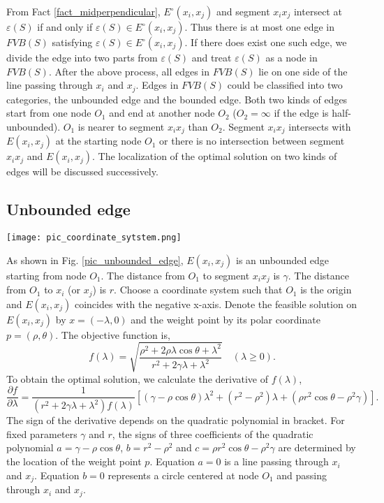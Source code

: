 \documentclass[final,3p,times]{elsarticle}
\begin{document}
From Fact \ref{fact_midperpendicular}, $E^\circ(x_i,x_j)$ and segment $x_ix_j$ intersect at $\varepsilon(S)$ if and only if $\varepsilon(S)\in E^\circ(x_i,x_j)$. Thus there is at most one edge in $FVB(S)$ satisfying $\varepsilon(S)\in E^\circ(x_i,x_j)$. If there does exist one such edge, we divide the edge into two parts from $\varepsilon(S)$ and treat $\varepsilon(S)$ as a node in $FVB(S)$. After the above process, all edges in $FVB(S)$ lie on one side of the line passing through $x_i$ and $x_j$. Edges in $FVB(S)$ could be classified into two categories, the unbounded edge and the bounded edge. Both two kinds of edges start from one node $O_1$ and end at another node $O_2$ ($O_2=\infty$ if the edge is half-unbounded). $O_1$ is nearer to segment $x_ix_j$ than $O_2$. Segment $x_ix_j$ intersects with $E(x_i,x_j)$ at the starting node $O_1$ or there is no intersection between segment $x_ix_j$ and $E(x_i,x_j)$. The localization of the optimal solution on two kinds of edges will be discussed successively.

\subsection{Unbounded edge}%
\begin{figure*}
  \centering
  \texttt{[image: pic\_coordinate\_sytstem.png]}
  \caption{The coordinate system for a single edge in $FVB(S)$}
  \label{pic_unbounded_edge}
\end{figure*}
As shown in Fig. \ref{pic_unbounded_edge}, $E(x_i,x_j)$ is an unbounded edge starting from node $O_1$. The distance from $O_1$ to segment $x_ix_j$ is $\gamma$. The distance from $O_1$ to $x_i$ (or $x_j$) is $r$. Choose a coordinate system such that $O_1$ is the origin and $E(x_i,x_j)$ coincides with the negative x-axis. Denote the feasible solution on $E(x_i,x_j)$ by $x=(-\lambda,0)$ and the weight point by its polar coordinate $p=(\rho,\theta)$. The objective function is,
\begin{equation}
\label{eq_objectfunction_unbounded}
f(\lambda)=\sqrt{\frac{\rho^2+2\rho\lambda\cos\theta+\lambda^2}{r^2+2\gamma\lambda+\lambda^2}} \quad(\lambda\geq0).
\end{equation}
To obtain the optimal solution, we calculate the derivative of $f(\lambda)$,
\begin{equation*}
\frac{\partial f}{\partial \lambda} = \frac{1}{(r^2+2\gamma\lambda+\lambda^2)f(\lambda)}
[(\gamma-\rho\cos\theta)\lambda^2+(r^2-\rho^2)\lambda+(\rho r^2\cos\theta-\rho^2\gamma)].
\end{equation*}
The sign of the derivative depends on the quadratic polynomial in bracket. For fixed parameters $\gamma$ and $r$, the signs of three coefficients of the quadratic polynomial $a=\gamma-\rho\cos\theta$, $b=r^2-\rho^2$ and $c=\rho r^2\cos\theta-\rho^2\gamma$ are determined by the location of the weight point $p$. Equation $a=0$ is a line passing through $x_i$ and $x_j$. Equation $b=0$ represents a circle centered at node $O_1$ and passing through $x_i$ and $x_j$.
\end{document}
